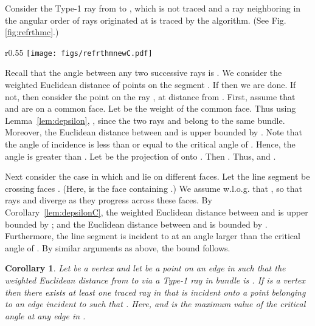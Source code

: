 \documentclass[11pt]{article}
\newtheorem{cor}{Corollary}
\newenvironment{proof}{\par\noindent{\bf Proof:}}{\mbox{}\hfill\\}
\newcommand{\ignore}[1]{ }
\begin{document}
\begin{proof}
Consider the Type-1 ray  from  to , which is not traced and a ray  neighboring  in the angular order of rays originated at  is traced by the algorithm. 
(See Fig. \ref{fig:refrthmc}.)

\begin{wrapfigure}{r}{0.55\textwidth}
\centering
\texttt{[image: figs/refrthmnewC.pdf]}
\caption{\footnotesize Illustrating the construction in proving the Lemma \ref{lem:errorX} }
\label{fig:refrthmc}
\end{wrapfigure}

\ignore {
\begin{center}
\texttt{[image: figs/refrthmnewCb.pdf]}
}

Recall that the angle between any two successive rays is . 
We consider the weighted Euclidean distance of points on the segment .
If  then we are done.
If not, then  consider the point  on the ray ,  at distance  from .
First, assume that  and  are on a common face. 
Let  be the weight of the common face.
Thus using Lemma~\ref{lem:depsilon},  , since the two rays  and  belong to the same bundle. Moreover,
the Euclidean distance between  and  is upper bounded by .
Note that the angle of incidence  is less than or equal to the critical angle of . 
Hence, the  angle is greater than .
Let  be the projection of  onto .
Then .
Thus, 
and 
.

Next consider the case in which  and  lie on different faces. 
Let the line segment  be crossing faces .
(Here,  is the face containing .)
We assume w.l.o.g. that , so that rays  and  diverge as they progress across these faces.
By Corollary~\ref{lem:depsilonC}, the weighted Euclidean distance between  and  is upper bounded by ;
and the Euclidean distance between  and  is bounded by . 
Furthermore, the line segment  is incident to  at an angle larger than the critical angle of . 
By similar arguments as above, the bound follows.
\end{proof}

\begin{cor}
\label{cor:errorX}
Let  be a vertex and let  be a point on an edge  in  such that the weighted Euclidean distance from  to  via a Type-1 ray in  bundle  is .
If  is a vertex then there exists at least one traced ray in  that is incident onto a point  belonging to an edge  incident to  such that .
Here,  and  is the maximum value of the critical angle at any edge in . 
\end{cor}
\end{document}
